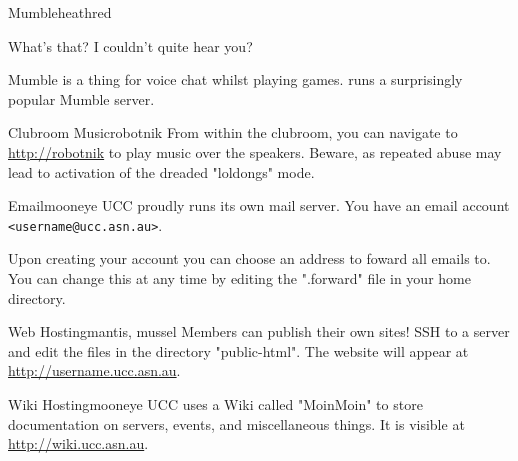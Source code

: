 \begin{uccservice}{Mumble}{heathred}

What's that? I couldn't quite hear you?

Mumble is a thing for voice chat whilst playing games.  runs a surprisingly popular Mumble server.

\end{uccservice}

\begin{uccservice}{Clubroom Music}{robotnik}
From within the clubroom, you can navigate to \url{http://robotnik} to play music over the speakers. Beware, as repeated abuse may lead to activation of the dreaded "loldongs" mode.
\end{uccservice}

\begin{uccservice}{Email}{mooneye}
UCC proudly runs its own mail server. You have an email account \texttt{<username@ucc.asn.au>}.

Upon creating your account you can choose an address to foward all emails to. You can change this at any time by editing the ".forward" file in your home directory.
\begin{comment}
Alternately, you can use one of several methods to check your UCC email directly.
\begin{enumerate}
	\item alpine --- Connect via SSH and run "alpine".
	\item webmail --- Several options will be presented to you at \url{http://webmail.ucc.asn.au}
	\item mail client (eg: Thunderbird) --- The server name is \server{secure.ucc.asn.au}. Use port 993 and IMAP. With your UCC username and password.
\end{enumerate}
\end{comment}

\end{uccservice}

\begin{uccservice}{Web Hosting}{mantis, mussel}
Members can publish their own sites! SSH to a server and edit the files in the directory "public-html". The website will appear at \url{http://username.ucc.asn.au}.
\end{uccservice}

\begin{uccservice}{Wiki Hosting}{mooneye}
UCC uses a Wiki called "MoinMoin" to store documentation on servers, events, and miscellaneous things. It is visible at \url{http://wiki.ucc.asn.au}.
\end{uccservice}

